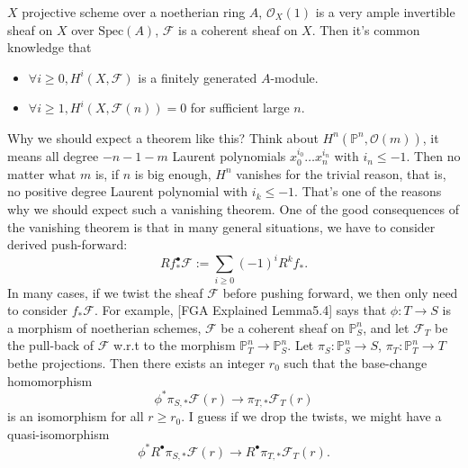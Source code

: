\documentclass[../main.tex]{subfiles}
\begin{document}
\begin{example}

\end{example}





\begin{example}[Why $H^{i}(X, \mathscr{F}(n))=0$?]
$X$ projective scheme over a noetherian ring $A$, $\mathcal{O}_{X}(1)$ is a very ample invertible sheaf on $X$ over $\mathrm{Spec}(A)$, $\mathscr{F}$ is a coherent sheaf on $X$. Then it's common knowledge that 
\begin{itemize}
\item $\forall i\geq 0, H^{i}(X, \mathscr{F})$ is a finitely generated $A$-module.
\item $\forall i\geq 1, H^{i}(X, \mathscr{F}(n))=0$ for sufficient large $n$.
\end{itemize}
Why we should expect a theorem like this? Think about $H^{n}(\mathbb{P}^{n}, \mathcal{O}(m))$, it means all degree $-n-1-m$ Laurent polynomials $x_{0}^{i_{0}}\dots x_{n}^{i_{n}}$ with $i_{n}\leq -1$. Then no matter what $m$ is, if $n$ is big enough, $H^{n}$ vanishes for the trivial reason, that is, no positive degree Laurent polynomial with $i_{k}\leq -1$. That's one of the reasons why we should expect such a vanishing theorem. One of the good consequences of the vanishing theorem is that in many general situations, we have to consider derived push-forward: 
$$Rf_{*}^{\bullet}\mathscr{F}:=\sum_{i\geq 0}(-1)^{i}R^{k}f_{*}.$$
In many cases, if we twist the sheaf $\mathscr{F}$ before pushing forward, we then only need to consider $f_{*}\mathscr{F}$. For example, [FGA Explained Lemma5.4] says that $\phi: T\rightarrow S$ is a morphism of noetherian schemes, $\mathscr{F}$ be a coherent sheaf on $\mathbb{P}_{S}^{n}$, and let $\mathscr{F}_{T}$ be the pull-back of $\mathscr{F}$ w.r.t to the morphism $\mathbb{P}_{T}^{n}\rightarrow \mathbb{P}_{S}^{n}$. Let $\pi_{S}: \mathbb{P}_{S}^{n}\rightarrow S$, $\pi_{T}: \mathbb{P}_{T}^{n}\rightarrow T$ bethe projections. Then there exists an integer $r_{0}$ such that the base-change homomorphism 
$$\phi^{*}\pi_{S, *}\mathscr{F}(r)\rightarrow \pi_{T,*}\mathscr{F}_{T}(r)$$
is an isomorphism for all $r\geq r_{0}$. I guess if we drop the twists, we might have a quasi-isomorphism
$$\phi^{*}R^{\bullet}\pi_{S, *}\mathscr{F}(r)\rightarrow R^{\bullet}\pi_{T,*}\mathscr{F}_{T}(r).$$
\end{example}
\end{document}
